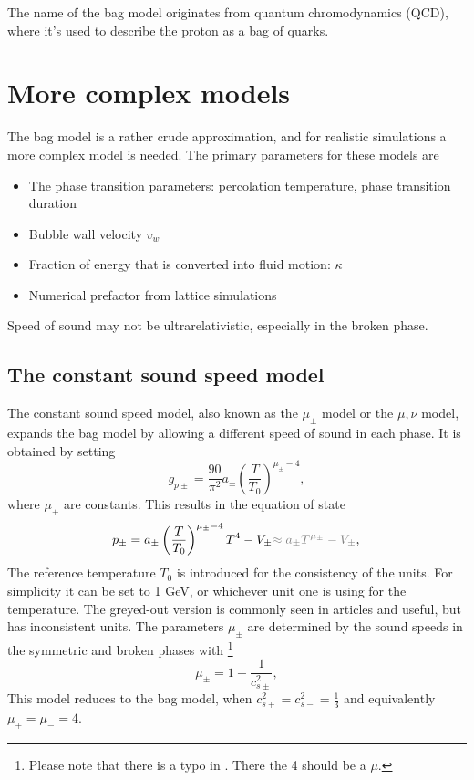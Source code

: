 The name of the bag model originates from quantum chromodynamics (QCD), where it's used to describe the proton as a bag of quarks.


\section{More complex models}
The bag model is a rather crude approximation, and for realistic simulations a more complex model is needed.
The primary parameters for these models are
\begin{itemize}
    \item The phase transition parameters: percolation temperature, phase transition duration
    \item Bubble wall velocity $v_w$
    \item Fraction of energy that is converted into fluid motion: $\kappa$
    \item Numerical prefactor from lattice simulations
\end{itemize}

Speed of sound may not be ultrarelativistic, especially in the broken phase.

\subsection{The constant sound speed model}
The constant sound speed model, also known as the $\mu_\pm$ model or the $\mu, \nu$ model,
expands the bag model by allowing a different speed of sound in each phase.
It is obtained by setting
\begin{equation}
g_{p\pm} = \frac{90}{\pi^2} a_\pm \left( \frac{T}{T_0} \right)^{\mu_\pm - 4},
\end{equation}
where $\mu_\pm$ are constants.
This results in the equation of state
\cites[eq. 15]{giese_2021}[eq. 38]{giese_2020}
\begin{equation}
p_\pm = a_\pm \left( \frac{T}{T_0} \right)^{\mu_\pm - 4} T^4 - V_\pm {\color{gray} \approx a_\pm T^{\mu_\pm} - V_\pm }, \\
\end{equation}
The reference temperature $T_0$ is introduced for the consistency of the units.
For simplicity it can be set to 1 GeV, or whichever unit one is using for the temperature.
The greyed-out version is commonly seen in articles and useful, but has inconsistent units.
The parameters $\mu_\pm$ are determined by the sound speeds in the symmetric and broken phases with
\cites[eq. 16]{giese_2021}[eq. 39]{giese_2020}
\footnote{Please note that there is a typo in \cite[eq. 15]{giese_2021}. There the 4 should be a $\mu$.}
\begin{equation}
\mu_\pm = 1 + \frac{1}{c_{s\pm}^2},
\end{equation}
This model reduces to the bag model,
when $c_{s+}^2 = c_{s-}^2 = \frac{1}{3}$
and equivalently
$\mu_+ = \mu_- = 4$.

